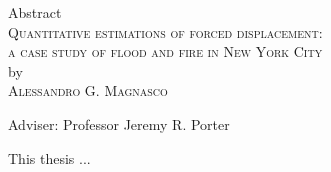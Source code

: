 \begin{center}
Abstract \\
\textsc{Quantitative estimations of forced displacement: \\a case study of flood and fire in New York City} \\
by \\
\textsc{Alessandro G. Magnasco} \\[0.25in]
\end{center}

\vspace{0.25in}

\noindent Adviser: Professor Jeremy R. Porter

\vspace{0.25in}

\noindent This thesis ...